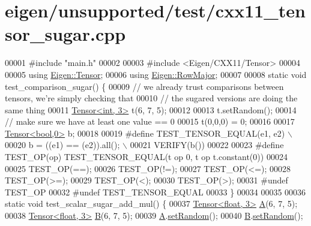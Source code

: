 \hypertarget{eigen_2unsupported_2test_2cxx11__tensor__sugar_8cpp_source}{}\section{eigen/unsupported/test/cxx11\+\_\+tensor\+\_\+sugar.cpp}
\label{eigen_2unsupported_2test_2cxx11__tensor__sugar_8cpp_source}

\begin{DoxyCode}
00001 \textcolor{preprocessor}{#include "main.h"}
00002 
00003 \textcolor{preprocessor}{#include <Eigen/CXX11/Tensor>}
00004 
00005 \textcolor{keyword}{using} \hyperlink{class_eigen_1_1_tensor}{Eigen::Tensor};
00006 \textcolor{keyword}{using} \hyperlink{group__enums_ggaacded1a18ae58b0f554751f6cdf9eb13acfcde9cd8677c5f7caf6bd603666aae3}{Eigen::RowMajor};
00007 
00008 \textcolor{keyword}{static} \textcolor{keywordtype}{void} test\_comparison\_sugar() \{
00009   \textcolor{comment}{// we already trust comparisons between tensors, we're simply checking that}
00010   \textcolor{comment}{// the sugared versions are doing the same thing}
00011   \hyperlink{class_eigen_1_1_tensor}{Tensor<int, 3>} t(6, 7, 5);
00012 
00013   t.setRandom();
00014   \textcolor{comment}{// make sure we have at least one value == 0}
00015   t(0,0,0) = 0;
00016 
00017   \hyperlink{class_eigen_1_1_tensor}{Tensor<bool,0>} b;
00018 
00019 \textcolor{preprocessor}{#define TEST\_TENSOR\_EQUAL(e1, e2) \(\backslash\)}
00020 \textcolor{preprocessor}{  b = ((e1) == (e2)).all();       \(\backslash\)}
00021 \textcolor{preprocessor}{  VERIFY(b())}
00022 
00023 \textcolor{preprocessor}{#define TEST\_OP(op) TEST\_TENSOR\_EQUAL(t op 0, t op t.constant(0))}
00024 
00025   TEST\_OP(==);
00026   TEST\_OP(!=);
00027   TEST\_OP(<=);
00028   TEST\_OP(>=);
00029   TEST\_OP(<);
00030   TEST\_OP(>);
00031 \textcolor{preprocessor}{#undef TEST\_OP}
00032 \textcolor{preprocessor}{#undef TEST\_TENSOR\_EQUAL}
00033 \}
00034 
00035 
00036 \textcolor{keyword}{static} \textcolor{keywordtype}{void} test\_scalar\_sugar\_add\_mul() \{
00037   \hyperlink{class_eigen_1_1_tensor}{Tensor<float, 3>} \hyperlink{group___core___module_class_eigen_1_1_matrix}{A}(6, 7, 5);
00038   \hyperlink{class_eigen_1_1_tensor}{Tensor<float, 3>} \hyperlink{group___core___module_class_eigen_1_1_matrix}{B}(6, 7, 5);
00039   \hyperlink{group___core___module_class_eigen_1_1_matrix}{A}.\hyperlink{class_eigen_1_1_plain_object_base_af0e576a0e1aefc9ee346de44cc352ba3}{setRandom}();
00040   \hyperlink{group___core___module_class_eigen_1_1_matrix}{B}.\hyperlink{class_eigen_1_1_plain_object_base_af0e576a0e1aefc9ee346de44cc352ba3}{setRandom}();

\end{DoxyCode}
